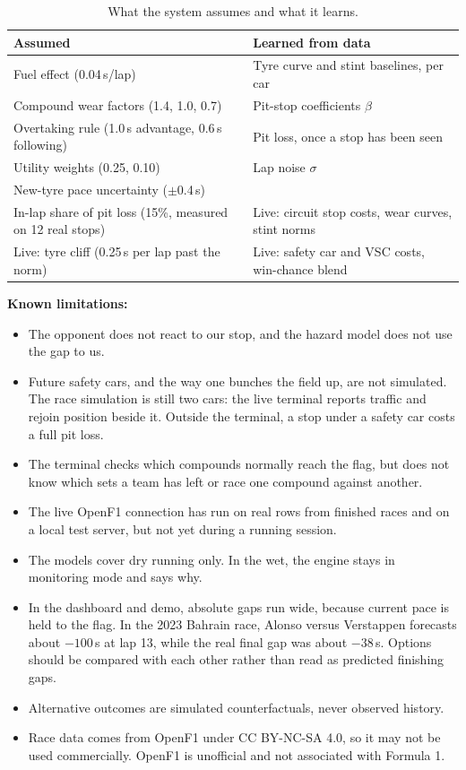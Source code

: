 \documentclass[11pt,a4paper]{article}
\begin{document}
\begin{table}[H]
\centering
\small
\begin{tabular}{@{}>{\raggedright\arraybackslash}p{7.6cm}>{\raggedright\arraybackslash}p{7.2cm}@{}}
\toprule
Assumed & Learned from data \\
\midrule
Fuel effect (0.04\,s/lap) & Tyre curve and stint baselines, per car \\
Compound wear factors (1.4, 1.0, 0.7) & Pit-stop coefficients $\beta$ \\
Overtaking rule (1.0\,s advantage, 0.6\,s following) & Pit loss, once a stop has been seen \\
Utility weights (0.25, 0.10) & Lap noise $\sigma$ \\
New-tyre pace uncertainty ($\pm$0.4\,s) & \\
In-lap share of pit loss (15\%, measured on 12 real stops) & Live: circuit stop costs, wear curves, stint norms \\
Live: tyre cliff (0.25\,s per lap past the norm) & Live: safety car and VSC costs, win-chance blend \\
\bottomrule
\end{tabular}
\caption{What the system assumes and what it learns.}
\end{table}

\textbf{Known limitations:}
\begin{itemize}
  \item The opponent does not react to our stop, and the hazard model does not use the gap
        to us.
  \item Future safety cars, and the way one bunches the field up, are not simulated. The race
        simulation is still two cars: the live terminal reports traffic and rejoin position
        beside it. Outside the terminal, a stop under a safety car costs a full pit loss.
  \item The terminal checks which compounds normally reach the flag, but does not know which
        sets a team has left or race one compound against another.
  \item The live OpenF1 connection has run on real rows from finished races and on a local
        test server, but not yet during a running session.
  \item The models cover dry running only. In the wet, the engine stays in monitoring mode
        and says why.
  \item In the dashboard and demo, absolute gaps run wide, because current pace is held to the flag. In the 2023 Bahrain
        race, Alonso versus Verstappen forecasts about $-100$\,s at lap 13, while the real
        final gap was about $-38$\,s. Options should be compared with each other rather than
        read as predicted finishing gaps.
  \item Alternative outcomes are simulated counterfactuals, never observed history.
  \item Race data comes from OpenF1 under CC BY-NC-SA 4.0, so it may not be used commercially.
        OpenF1 is unofficial and not associated with Formula 1.
\end{itemize}
\end{document}
